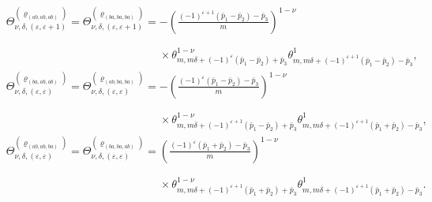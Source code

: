 \documentclass[pdftex]{sigma}
\def\bos{\varrho}
\theoremstyle{definition}
\numberwithin{equation}{section}
\begin{document}
\begin{align*}
& \Theta_{\nu,\delta,(\varepsilon,\varepsilon+1)}^{(\bos_{(ab,ab,ab)})}= \Theta_{\nu,\delta,(\varepsilon,\varepsilon+1)}^{(\bos_{(ba,ba,ba)})} = - \left(\frac{(-1)^{\varepsilon+1}({\bar p_1}-{\bar p_2})-{\bar p_3}}{m}\right)^{1-\nu}\\
&\phantom{ \Theta_{\nu,\delta,(\varepsilon,\varepsilon+1)}^{(\bos_{(ab,ab,ab)})}= \Theta_{\nu,\delta,(\varepsilon,\varepsilon+1)}^{(\bos_{(ba,ba,ba)})} =}{}\times
 \theta^{1-\nu}_{m,m\delta+(-1)^{\varepsilon}(\bar p_1-\bar p_2)+\bar p_3} \theta^1_{m,m\delta+ (-1)^{\varepsilon+1} (\bar p_1-\bar p_2) -\bar p_3}, \\
& \Theta_{\nu,\delta,(\varepsilon,\varepsilon)}^{(\bos_{(ba,ab,ab)})}= \Theta_{\nu,\delta,(\varepsilon,\varepsilon)}^{(\bos_{(ab,ba,ba)})} =- \left(\frac{(-1)^{\varepsilon}({\bar p_1}-{\bar p_2})-{\bar p_3}}{m}\right)^{1-\nu}\\
&\phantom{\Theta_{\nu,\delta,(\varepsilon,\varepsilon)}^{(\bos_{(ba,ab,ab)})}= \Theta_{\nu,\delta,(\varepsilon,\varepsilon)}^{(\bos_{(ab,ba,ba)})} =}{}\times
 \theta^{1-\nu}_{m,m\delta+(-1)^{\varepsilon+1}(\bar p_1-\bar p_2)+ \bar p_3} \theta^1_{m,m\delta+ (-1)^{\varepsilon+1} (\bar p_1+\bar p_2) -\bar p_3},
 \\
& \Theta_{\nu,\delta,(\varepsilon,\varepsilon)}^{(\bos_{(ab,ab,ba)})}= \Theta_{\nu,\delta,(\varepsilon,\varepsilon)}^{(\bos_{(ba,ba,ab)})} = \left(\frac{(-1)^{\varepsilon}({\bar p_1}+{\bar p_2})-{\bar p_3}}{m}\right)^{1-\nu}\\
&\phantom{ \Theta_{\nu,\delta,(\varepsilon,\varepsilon)}^{(\bos_{(ab,ab,ba)})}= \Theta_{\nu,\delta,(\varepsilon,\varepsilon)}^{(\bos_{(ba,ba,ab)})} =}{}\times
 \theta^{1-\nu}_{m,m\delta+(-1)^{\varepsilon+1}(\bar p_1+\bar p_2)+\bar p_3} \theta^1_{m,m\delta+ (-1)^{\varepsilon+1} (\bar p_1+\bar p_2) -\bar p_3} .
\end{align*}
\end{document}

